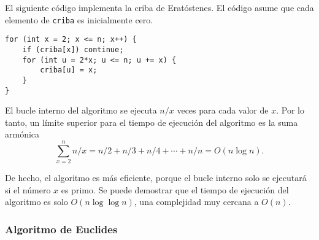 \begin{center}
\end{center}

El siguiente código implementa la criba de
Eratóstenes.
El código asume que cada elemento de
\texttt{criba} es inicialmente cero.

\begin{lstlisting}
for (int x = 2; x <= n; x++) {
    if (criba[x]) continue;
    for (int u = 2*x; u <= n; u += x) {
        criba[u] = x;
    }
}
\end{lstlisting}

El bucle interno del algoritmo se ejecuta
$n/x$ veces para cada valor de $x$.
Por lo tanto, un límite superior para el tiempo de ejecución
del algoritmo es la suma armónica
\[\sum_{x=2}^n n/x = n/2 + n/3 + n/4 + \cdots + n/n = O(n \log n).\]


De hecho, el algoritmo es más eficiente,
porque el bucle interno solo se ejecutará si
el número $x$ es primo.
Se puede demostrar que el tiempo de ejecución del
algoritmo es solo $O(n \log \log n)$,
una complejidad muy cercana a $O(n)$. 

\subsubsection{Algoritmo de Euclides}


